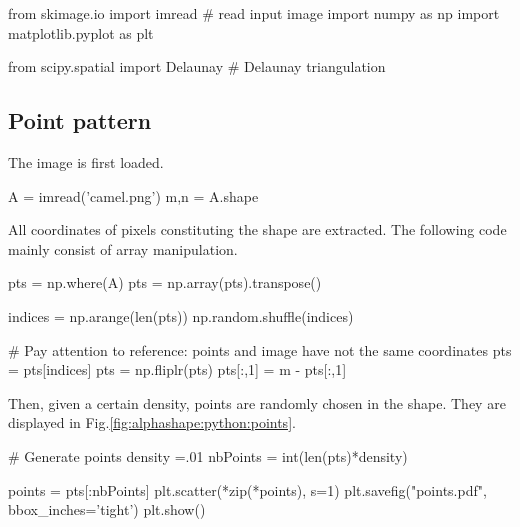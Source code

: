 
\begin{python}
from skimage.io import imread # read input image
import numpy as np
import matplotlib.pyplot as plt

from scipy.spatial import Delaunay # Delaunay triangulation
\end{python}


\subsection{Point pattern}

The image is first loaded.
\begin{python}
A = imread('camel.png')
m,n = A.shape
\end{python}

All coordinates of pixels constituting the shape are extracted. The following code mainly consist of array manipulation.

\begin{python}
pts = np.where(A)
pts = np.array(pts).transpose()

indices = np.arange(len(pts))
np.random.shuffle(indices)

# Pay attention to reference: points and image have not the same coordinates
pts = pts[indices]
pts = np.fliplr(pts)
pts[:,1] = m - pts[:,1]
\end{python}

Then, given a certain density, points are randomly chosen in the shape. They are displayed in Fig.\ref{fig:alphashape:python:points}.

\begin{python}
# Generate points
density =.01
nbPoints = int(len(pts)*density)

points = pts[:nbPoints]
plt.scatter(*zip(*points), s=1)
plt.savefig("points.pdf", bbox_inches='tight')
plt.show()
\end{python}


